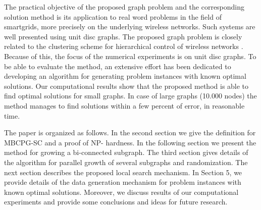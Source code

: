 The practical objective of the proposed graph problem and the corresponding solution method is its application to real word problems in the field of smartgrids, more precisely on the underlying wireless networks. Such systems are well presented using unit disc graphs. The proposed graph problem is closely related to the clustering scheme for hierarchical control of wireless networks \citep{banerjee2001clustering,chang2006cluster}. Because of this,  the focus of the numerical experiments is on unit disc graphs. To be able to evaluate the method, an extensive effort has been dedicated to developing an algorithm for generating problem instances with known optimal solutions. Our computational results  show that the proposed method is able to find optimal solutions for small graphs. In case of large graphs (10.000 nodes) the method manages to find solutions within a few percent of error, in reasonable time. 

The paper is organized as follows. In the second section we give the definition for MBCPG-SC and a proof of NP- hardness. In the following section we present the method for growing a bi-connected subgraph. The third section gives  details of the algorithm for parallel growth of several subgraphs and randomization. The next section describes the proposed local search mechanism. In Section 5, we provide details of the data generation mechanism for problem instances with known optimal solutions. Moreover, we discuss results of our computational experiments and provide some conclusions and ideas for future research.




